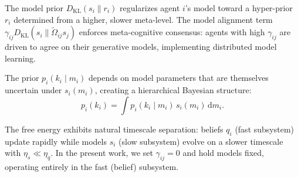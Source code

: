 \documentclass[twoside,11pt]{article}
\begin{document}
The model prior $D_{\mathrm{KL}}(s_i \| r_i)$ regularizes agent $i$'s model toward a hyper-prior $r_i$ determined from a higher, slower meta-level. The model alignment term $\gamma_{ij} D_{\mathrm{KL}}(s_i \| \tilde{\Omega}_{ij} s_j)$ enforces meta-cognitive consensus: agents with high $\gamma_{ij}$ are driven to agree on their generative models, implementing distributed model learning.

The prior $p_i(k_i \mid m_i)$ depends on model parameters that are themselves uncertain under $s_i(m_i)$, creating a hierarchical Bayesian structure:
\begin{equation}
p_i(k_i) = \int p_i(k_i \mid m_i) \, s_i(m_i) \, \mathrm{d}m_i.
\end{equation}

The free energy exhibits natural timescale separation: beliefs $q_i$ (fast subsystem) update rapidly while models $s_i$ (slow subsystem) evolve on a slower timescale with $\eta_s \ll \eta_q$. In the present work, we set $\gamma_{ij} = 0$ and hold models fixed, operating entirely in the fast (belief) subsystem.




\end{document}
